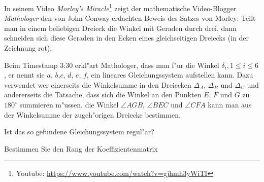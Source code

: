 In seinem Video {\em Morley's Miracle}\footnote{Youtube: \url{https://www.youtube.com/watch?v=gjhmh3yWiTI}}
zeigt der mathematische Video-Blogger
{\em Mathologer} den von John Conway erdachten Beweis des Satzes von Morley:
Teilt man in einem beliebigen Dreieck die Winkel mit Geraden durch drei, dann
schneiden sich diese Geraden in den Ecken eines gleichseitigen Dreiecks
(in der Zeichnung rot):
\begin{center}
\end{center}
Beim Timestamp 3:30 erkl"art Mathologer, dass man f"ur die Winkel
$\delta_i,1\le i\le 6$, er nennt sie $a$, $b$,$c$, $d$, $e$, $f$, ein
lineares Gleichungssystem aufstellen kann. 
Dazu verwendet wer einerseits die Winkelsumme in den Dreiecken $\Delta_A$,
$\Delta_B$ und $\Delta_C$ und andererseits die Tatsache, dass sich die
Winkel an den Punkten $E$, $F$ und $G$ zu $180^\circ$ summieren m"ussen.
die Winkel $\angle AGB$, $\angle BEC$ und $\angle CFA$ kann man aus
der Winkelsumme der zugeh"origen Dreiecke bestimmen.
\begin{teilaufgaben}
\item
Ist das so gefundene Gleichungssystem regul"ar?
\item
Bestimmen Sie den Rang der Koeffizientenmatrix
\end{teilaufgaben}

